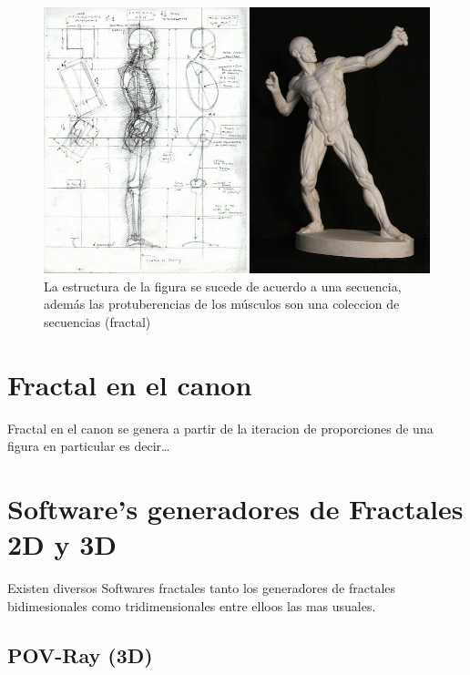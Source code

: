 \documentclass[
  11pt,
]{krantz}
\theoremstyle{definition}
\theoremstyle{definition}
\theoremstyle{definition}
\theoremstyle{definition}
\theoremstyle{remark}
\begin{document}
\begin{figure}[!ht]

{\centering \includegraphics[width=1\linewidth]{body2} 

}

\caption{La estructura de la figura se sucede de acuerdo a una secuencia, además las protuberencias de los músculos son una coleccion de secuencias (fractal)}\label{fig:body2}
\end{figure}

\hypertarget{fractal-en-el-canon}{%
\section{Fractal en el canon}\label{fractal-en-el-canon}}

Fractal en el canon se genera a partir de la iteracion de proporciones de una figura en particular es decir\ldots{}

\hypertarget{softwares-generadores-de-fractales-2d-y-3d}{%
\section{Software's generadores de Fractales 2D y 3D}\label{softwares-generadores-de-fractales-2d-y-3d}}

Existen diversos Softwares fractales tanto los generadores de fractales bidimesionales como tridimensionales entre elloos las mas usuales.

\hypertarget{pov-ray-3d}{%
\subsection{POV-Ray (3D)}\label{pov-ray-3d}}
\end{document}
